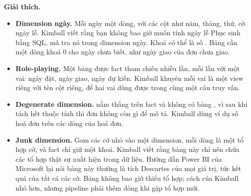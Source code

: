 \textbf{Giải thích.}
\begin{itemize}
  \item \textbf{Dimension ngày.} Mỗi ngày một dòng, với các cột như năm, tháng, thứ, cờ ngày lễ. Kimball viết rằng bạn không bao giờ muốn tính ngày lễ Phục sinh bằng SQL, mà tra nó trong dimension ngày. Khoá có thể là số . Bảng cần một dòng khoá 0 cho ngày chưa biết, như ngày giao của đơn chưa giao.
  \item \textbf{Role-playing.} Một bảng  được fact tham chiếu nhiều lần, mỗi lần với một vai: ngày đặt, ngày giao, ngày dự kiến. Kimball khuyên mỗi vai là một view riêng với tên cột riêng, để hai vai dùng được trong cùng một câu truy vấn.
  \item \textbf{Degenerate dimension.}  nằm thẳng trên fact và không có bảng , vì sau khi tách hết thuộc tính thì đơn không còn gì để mô tả. Kimball dùng ví dụ số hoá đơn trên các dòng của hoá đơn.
  \item \textbf{Junk dimension.} Gom các cờ nhỏ vào một dimension, mỗi dòng là một tổ hợp cờ, và fact chỉ giữ một khoá. Kimball viết rằng bảng này chỉ nên chứa các tổ hợp thật sự xuất hiện trong dữ liệu. Hướng dẫn Power BI của Microsoft lại nói bảng này thường là tích Descartes của mọi giá trị, tức kết quả  của tất cả các cờ. Bảng  không bao giờ thiếu tổ hợp; cách của Kimball nhỏ hơn, nhưng pipeline phải thêm dòng khi gặp tổ hợp mới.
\end{itemize}

